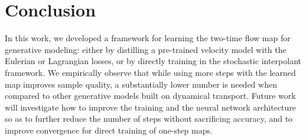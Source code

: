 \section{Conclusion}
\label{sec:conc}
%
In this work, we developed a framework for learning the two-time flow map for generative modeling: either by distilling a pre-trained velocity model with the Eulerian or Lagrangian losses, or by directly training in the stochastic interpolant framework.
%
We empirically observe that while using more steps with the learned map improves sample quality, a substantially lower number is needed when compared to other generative models built on dynamical transport.
%
Future work will investigate how to improve the training and the neural network architecture so as to further reduce the number of steps without sacrificing accuracy, and to improve convergence for direct training of one-step maps.
